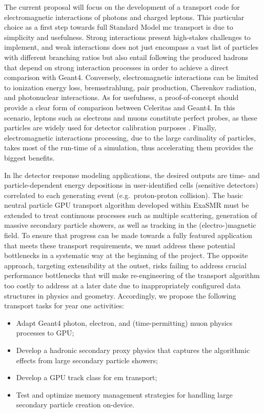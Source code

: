 \documentclass[10pt]{article}
\begin{document}
The current proposal will focus on the development of a transport code
for electromagnetic interactions of photons and charged leptons. This particular
choice as a first step towards full Standard Model \ac{mc} transport is due
to simplicity and usefulness. Strong interactions present high-stakes
challenges to implement, and weak interactions does not just encompass a vast
list of particles with different branching ratios but also entail following
the produced hadrons that depend on strong interaction processes in
order to achieve a direct comparison with Geant4. Conversely,
electromagnetic interactions can be limited to ionization energy loss,
bremsstrahlung, pair production, Cherenkov radiation, and photonuclear
interactions. As for usefulness, a proof-of-concept should provide a
clear form of comparison between Celeritas and Geant4. In this scenario,
leptons such as electrons and muons constitute perfect probes, as these
particles are widely used for detector calibration purposes
\cite{atlas_calibration_e,atlas_calibration_mu}.  Finally, electromagnetic interactions processing, due to the large cardinality of particles, takes most of
the run-time of a simulation, thus accelerating them provides the biggest benefits.

In \ac{lhc} detector response modeling applications, the desired outputs are
time- and particle-dependent energy depositions in user-identified cells
(sensitive detectors) correlated to each generating event
(e.g.~proton-proton collision). The basic neutral particle GPU transport
algorithm developed within ExaSMR must be extended to treat
continuous processes such as multiple scattering, generation of massive secondary
particle showers, as well as tracking in the (electro-)magnetic field. To ensure that progress can be made towards a fully featured application that meets these transport
requirements, we must address these potential bottlenecks in a
systematic way at the beginning of the project. The opposite approach, targeting extensibility at the outset, risks failing to
address crucial performance bottlenecks that will make
re-engineering of the transport algorithm too costly to address at a
later date due to inappropriately configured data structures in physics
and geometry. Accordingly, we propose the following transport tasks for
year one activities:
\begin{itemize}
 \itemsep2pt%
 \parskip0pt%
\item
  Adapt Geant4 photon, electron, and (time-permitting) muon physics processes to
  GPU;
\item
  Develop a hadronic secondary proxy physics that captures the
  algorithmic effects from large secondary particle showers;
\item
  Develop a GPU track class for \ac{em} transport;
\item
  Test and optimize memory management strategies for handling large
  secondary particle creation on-device.
\end{itemize}
\end{document}
